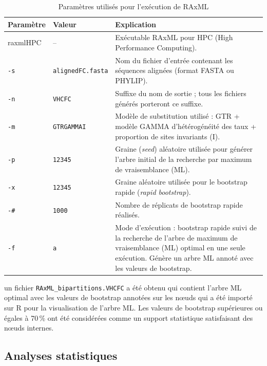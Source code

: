 \documentclass[a4paper,12pt]{article}
\begin{document}
\begin{table}[!htbp]
\centering
\caption{Paramètres utilisés pour l'exécution de RAxML}
\label{tab:raxml_parametres}
\begin{tabular}{p{3cm} p{3cm} p{8cm}}
\toprule
\textbf{Paramètre} & \textbf{Valeur} & \textbf{Explication} \\
\midrule
raxmlHPC & -- & Exécutable RAxML pour HPC (High Performance Computing). \\

\texttt{-s} & \texttt{alignedFC.fasta} &
Nom du fichier d'entrée contenant les séquences alignées (format FASTA ou PHYLIP). \\

\texttt{-n} & \texttt{VHCFC} &
Suffixe du nom de sortie ; tous les fichiers générés porteront ce suffixe. \\

\texttt{-m} & \texttt{GTRGAMMAI} &
Modèle de substitution utilisé : GTR + modèle GAMMA d'hétérogénéité des taux + proportion de sites invariants (I). \\

\texttt{-p} & \texttt{12345} &
Graine (\textit{seed}) aléatoire utilisée pour générer l'arbre initial de la recherche par maximum de vraisemblance (ML). \\

\texttt{-x} & \texttt{12345} &
Graine aléatoire utilisée pour le bootstrap rapide (\textit{rapid bootstrap}). \\

\texttt{-\#} & \texttt{1000} &
Nombre de réplicats de bootstrap rapide réalisés. \\

\texttt{-f} & \texttt{a} &
Mode d'exécution : bootstrap rapide suivi de la recherche de l'arbre de maximum de vraisemblance (ML) optimal en une seule exécution. Génère un arbre ML annoté avec les valeurs de bootstrap. \\
\bottomrule
\end{tabular}
\end{table}
\newpage
un fichier \texttt{RAxML\_bipartitions.VHCFC} a été obtenu qui contient l’arbre ML optimal avec les valeurs de bootstrap annotées sur les nœuds qui a été importé sur R pour la visualisation de l’arbre ML.
Les valeurs de bootstrap supérieures ou égales à 70\,\% ont été considérées comme un support statistique satisfaisant des nœuds internes.

\subsection {Analyses statistiques}
\end{document}
